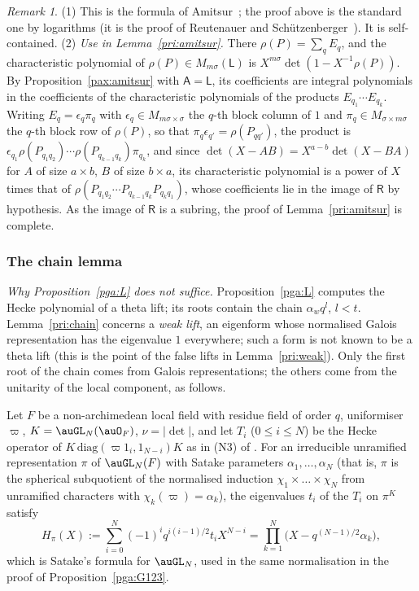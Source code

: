 \documentclass[10pt]{amsart}
\theoremstyle{definition}
\theoremstyle{remark}
\newtheorem{remark}[theorem]{Remark}
\begin{document}
\begin{remark}\label{pax:rem-amitsur}
(1) This is the formula of Amitsur~\cite{Amitsur}; the proof above is the standard one by
logarithms (it is the proof of Reutenauer and Sch\"utzenberger~\cite{ReutenauerSchutzenberger}). It is self-contained.
(2) \emph{Use in Lemma~\ref{pri:amitsur}.} There $\rho(P)=\sum_qE_q$, and the characteristic polynomial
of $\rho(P)\in M_{m\sigma}(\mathsf L)$ is $X^{m\sigma}\det(1-X^{-1}\rho(P))$. By
Proposition~\ref{pax:amitsur} with $\mathsf A=\mathsf L$, its coefficients are integral polynomials in
the coefficients of the characteristic polynomials of the products $E_{q_1}\cdots E_{q_k}$. Writing
$E_q=\epsilon_q\pi_q$ with $\epsilon_q\in M_{m\sigma\times\sigma}$ the $q$-th block column of $1$ and
$\pi_q\in M_{\sigma\times m\sigma}$ the $q$-th block row of $\rho(P)$, so that $\pi_q\epsilon_{q'}=
\rho(P_{qq'})$, the product is $\epsilon_{q_1}\rho(P_{q_1q_2})\cdots\rho(P_{q_{k-1}q_k})\pi_{q_k}$, and
since $\det(X-AB)=X^{a-b}\det(X-BA)$ for $A$ of size $a\times b$, $B$ of size $b\times a$, its
characteristic polynomial is a power of $X$ times that of $\rho(P_{q_1q_2}\cdots P_{q_{k-1}q_k}
P_{q_kq_1})$, whose coefficients lie in the image of $\mathsf R$ by hypothesis. As the image of
$\mathsf R$ is a subring, the proof of Lemma~\ref{pri:amitsur} is complete.
\end{remark}

\subsubsection{The chain lemma}\label{pax:ss-chain}

\emph{Why Proposition~\ref{pga:L} does not suffice.} Proposition~\ref{pga:L} computes the Hecke
polynomial of a theta lift; its roots contain the chain $\alpha_wq^l$, $l<t$. Lemma~\ref{pri:chain}
concerns a \emph{weak lift}, an eigenform whose normalised Galois representation has the eigenvalue
$1$ everywhere; such a form is not known to be a theta lift (this is the point of the false lifts in
Lemma~\ref{pri:weak}). Only the first root of the chain comes from Galois representations; the others
come from the unitarity of the local component, as follows.

Let $F$ be a non-archimedean local field with residue field of order $q$, uniformiser $\varpi$,
$K=\auGL_N(\auO_F)$, $\nu=|\det|$, and let $T_i$ ($0\le i\le N$) be the Hecke operator of $K\,
\mathrm{diag}(\varpi1_i,1_{N-i})K$ as in (N3) of {\cite[\S6.1]{P49}}. For an irreducible unramified
representation $\pi$ of $\auGL_N(F)$ with Satake parameters $\alpha_1,\dots,\alpha_N$ (that is, $\pi$
is the spherical subquotient of the normalised induction $\chi_1\times\dots\times\chi_N$ from
unramified characters with $\chi_k(\varpi)=\alpha_k$), the eigenvalues $t_i$ of the $T_i$ on
$\pi^K$ satisfy
\begin{equation}\label{pax:eq-satake}
H_\pi(X):=\sum_{i=0}^N(-1)^iq^{i(i-1)/2}t_iX^{N-i}=\prod_{k=1}^N\bigl(X-q^{(N-1)/2}\alpha_k\bigr),
\end{equation}
which is Satake's formula for $\auGL_N$, used in the same normalisation in the proof of
Proposition~\ref{pga:G123}.
\end{document}
